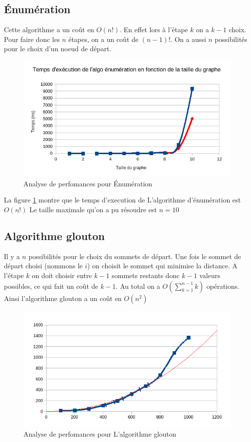 \documentclass[11pt]{article} \usepackage[top=2cm, bottom=2cm, left=2cm, right=2cm]{geometry}
\begin{document}
\subsection*{\'Enumération}
Cette algorithme a un coût en $O(n!)$. En effet lors à l'étape $k$ on a $k-1$ choix. Pour faire donc les $n$ étapes, on
a un coût de $(n-1)!$. On  a aussi $n$ possibilités pour le choix d'un noeud de départ.
  \begin{figure}[ht]
\begin{center}
  
  \includegraphics[scale=0.8]{images/exec_enum.png}
  \caption{Analyse de perfomances pour \'Enumération}
  \label{fig:enum}
\end{center}
\end{figure}
La figure \ref{fig:enum} montre que le temps d'execution de L'algorithme d'énumération est $O(n!)$
Le taille maximale qu'on a pu résoudre est $n=10$
\subsection*{Algorithme glouton}
Il y a $n$ possibilités pour le choix du sommets de départ. Une fois le sommet de départ choisi (nommons le $i$) on choisit le sommet qui
minimise la distance. A l'étape $k$ on doit choisir entre $k-1$ sommets restants donc $k-1$ valeurs possibles, ce qui fait un coût de $k-1$. Au
total on a $O(\sum_{k=1}^{n-1} k)$ opérations. 
Ainsi l'algorithme glouton a un coût en $O(n^2)$
  \begin{figure}[ht]
\begin{center}
  
  \includegraphics[scale=0.8]{images/exec_glouton.png}
  \caption{Analyse de perfomances pour L'algorithme glouton}
  \label{fig:glouton}
\end{center}
\end{figure}
\end{document}
